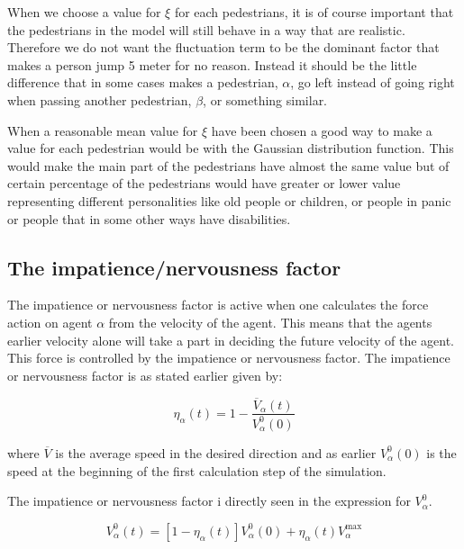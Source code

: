 When we choose a value for $\xi$ for each pedestrians, it is of course important that the 
pedestrians in the model will still behave in a way that are realistic. Therefore we do not 
want the fluctuation term to be the dominant factor that makes a person jump 5 meter for no reason. 
Instead it should be the little difference that in some cases makes a pedestrian, $\alpha$, go left 
instead of going right when passing another pedestrian, $\beta$, or something similar.  

When a reasonable mean value for $\xi$ have been chosen a good way to make a value for each 
pedestrian would be with the Gaussian distribution function. This would make the main part of 
the pedestrians have almost the same value but of certain percentage of the pedestrians would 
have greater or lower value representing different personalities like old people or children, 
or people in panic or people that in some other ways have disabilities. 


\subsection{The impatience/nervousness factor}
The impatience or nervousness factor is active when one calculates the force action 
on agent $\alpha$ from the velocity of the agent. This means that the agents earlier 
velocity alone will take a part in deciding the future velocity of the agent. This 
force is controlled by the impatience or nervousness factor. The impatience or 
nervousness factor is as stated earlier given by:

\begin{equation}\label{n}
    \eta_{\alpha} \left( t \right) =
    1 - \frac{\overline{V}_{\alpha} \left( t \right)}
             {V_{\alpha}^{0} \left( 0 \right)}
\end{equation}

where $\overline{V}$ is the average speed in the desired direction and as 
earlier $V_{\alpha}^{0} \left( 0 \right)$ is the speed at the beginning of the 
first calculation step of the simulation.

The impatience or nervousness factor i directly seen in the expression for 
$V_{\alpha}^{0}$.

\begin{equation}\label{v0}
    V_{\alpha}^{0}(t) = \left[ 1 - \eta_{\alpha} \left( t \right) \right] 
    V_{\alpha}^{0} \left( 0 \right) +
    \eta_{\alpha} \left( t \right)V_{\alpha}^{\text{max}}
\end{equation}

